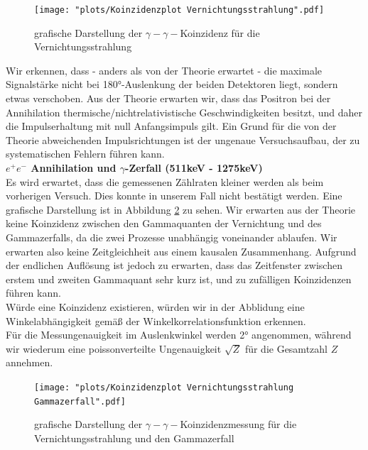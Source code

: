 \documentclass[%
aps,
onecolumn,
11pt,
tightenlines,
nofootinbib,
superscriptaddress,
floatfix,
prd,
]{revtex4-2}
\begin{document}
\begin{figure}[H]
	\centering
	\texttt{[image: "plots/Koinzidenzplot Vernichtungsstrahlung".pdf]}
	\caption{grafische Darstellung der $\gamma - \gamma -$Koinzidenz für die Vernichtungsstrahlung}
	\label{fig:coincidenceannihilation}
\end{figure}
Wir erkennen, dass - anders als von der Theorie erwartet - die maximale Signalstärke nicht bei 180°-Auslenkung der beiden Detektoren liegt, sondern etwas verschoben. Aus der Theorie erwarten wir, dass das Positron bei der Annihilation thermische/nichtrelativistische Geschwindigkeiten besitzt, und daher die Impulserhaltung mit null Anfangsimpuls gilt. Ein Grund für die von der Theorie abweichenden Impulsrichtungen ist der ungenaue Versuchsaufbau, der zu systematischen Fehlern führen kann. \vspace{10pt}\\
\textbf{$e^+e^- $ Annihilation und $\gamma$-Zerfall (511keV - 1275keV)}\\
Es wird erwartet, dass die gemessenen Zählraten kleiner werden als beim vorherigen Versuch. Dies konnte in unserem Fall nicht bestätigt werden. Eine grafische Darstellung ist in Abbildung \ref{fig:coincidenceannihilgamma} zu sehen. Wir erwarten aus der Theorie keine Koinzidenz zwischen den Gammaquanten der Vernichtung und des Gammazerfalls, da die zwei Prozesse unabhängig voneinander ablaufen. Wir erwarten also keine Zeitgleichheit aus einem kausalen Zusammenhang. Aufgrund der endlichen Auflösung ist jedoch zu erwarten, dass das Zeitfenster zwischen erstem und zweiten Gammaquant sehr kurz ist, und zu zufälligen Koinzidenzen führen kann. \\
Würde eine Koinzidenz existieren, würden wir in der Abblidung eine Winkelabhängigkeit gemäß der Winkelkorrelationsfunktion erkennen. \\
Für die Messungenauigkeit im Auslenkwinkel werden 2° angenommen, während wir wiederum eine poissonverteilte Ungenauigkeit $\sqrt{Z}$ für die Gesamtzahl $Z$ annehmen. 

\begin{figure}[H]
	\centering
	\texttt{[image: "plots/Koinzidenzplot Vernichtungsstrahlung Gammazerfall".pdf]}
	\caption{grafische Darstellung der $\gamma - \gamma -$Koinzidenzmessung für die Vernichtungsstrahlung und den Gammazerfall}
	\label{fig:coincidenceannihilgamma}
\end{figure}
\end{document}
